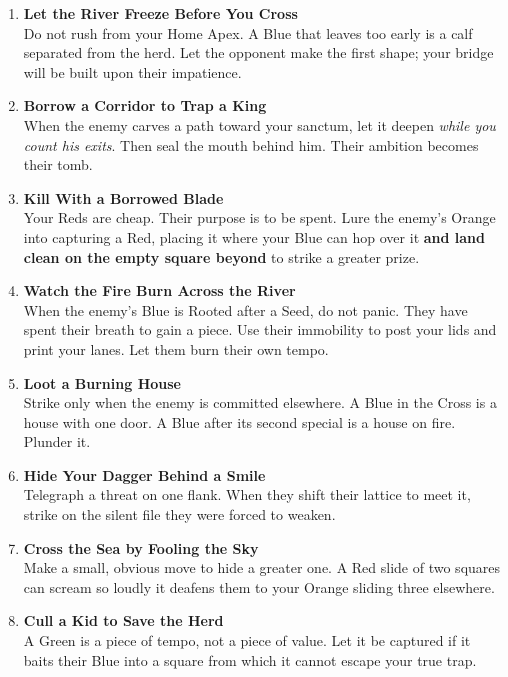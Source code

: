 \documentclass[11pt]{article}
\begin{document}
\begin{enumerate}[leftmargin=\textit{,label=\textbf{\arabic}.}]
\item \textbf{Let the River Freeze Before You Cross}\\
Do not rush from your Home Apex. A Blue that leaves too early is a calf separated from the herd. Let the opponent make the first shape; your bridge will be built upon their impatience.

\item \textbf{Borrow a Corridor to Trap a King}\\
When the enemy carves a path toward your sanctum, let it deepen \emph{while you count his exits}. Then seal the mouth behind him. Their ambition becomes their tomb.

\item \textbf{Kill With a Borrowed Blade}\\
Your Reds are cheap. Their purpose is to be spent. Lure the enemy's Orange into capturing a Red, placing it where your Blue can hop over it \textbf{and land clean on the empty square beyond} to strike a greater prize.

\item \textbf{Watch the Fire Burn Across the River}\\
When the enemy's Blue is Rooted after a Seed, do not panic. They have spent their breath to gain a piece. Use their immobility to post your lids and print your lanes. Let them burn their own tempo.

\item \textbf{Loot a Burning House}\\
Strike only when the enemy is committed elsewhere. A Blue in the Cross is a house with one door. A Blue after its second special is a house on fire. Plunder it.

\item \textbf{Hide Your Dagger Behind a Smile}\\
Telegraph a threat on one flank. When they shift their lattice to meet it, strike on the silent file they were forced to weaken.

\item \textbf{Cross the Sea by Fooling the Sky}\\
Make a small, obvious move to hide a greater one. A Red slide of two squares can scream so loudly it deafens them to your Orange sliding three elsewhere.

\item \textbf{Cull a Kid to Save the Herd}\\
A Green is a piece of tempo, not a piece of value. Let it be captured if it baits their Blue into a square from which it cannot escape your true trap.


\end{enumerate}
\end{document}
